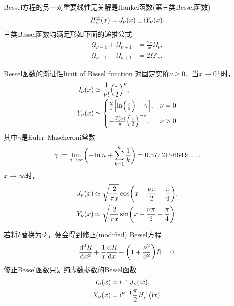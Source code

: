 Bessel方程的另一对重要线性无关解是Hankel函数(第三类Bessel函数)
\begin{equation}
    H_\nu^\pm(x) = J_\nu(x) \pm \i Y_\nu(x).
\end{equation}
三类Bessel函数均满足形如下面的递推公式
\begin{subequations}
    \label{eq:ed-cylindrical-bessel-recurrences}
    \begin{align}
        \Omega_{\nu-1} + \Omega_{\nu+1} &= \frac{2\nu}x\Omega_\nu,\\
        \Omega_{\nu-1} - \Omega_{\nu+1} &= 2\Omega'_\nu.
    \end{align}
\end{subequations}


\begin{example}{Bessel函数的渐进性}{limit of Bessel function}
    对固定实阶$\nu \ge 0$，当$x \to 0^+$时，
    \begin{subequations}
        \label{eq:ed-bessel-small-argument}
        \begin{align}
            J_\nu(x) &\simeq \frac1{\nu!}\Bigp{\frac x2}^\nu,\\
            Y_\nu(x) &\simeq
            \begin{cases}
                \frac2\pi\Bigb{\ln\Bigp{\frac x2} + \gamma},&\nu = 0\\[1ex]
                -\frac{\Gamma(\nu)}\pi\Bigp{\frac x2}^{-\nu},&\nu > 0
            \end{cases}
        \end{align}
    \end{subequations}
    其中$\gamma$是Euler--Mascheroni常数
    \[
        \gamma := \lim_{n\to\infty}\biggp{-\ln n + \sum_{k=1}^n\frac1k} = \num{0.5772156649}\ldots.
    \]
    \tcblower
    $x \to \infty$时，
    \begin{subequations}
        \label{eq:ed-bessel-large-argument}
        \begin{align}
            J_\nu(x) &\simeq \sqrt{\frac2{\pi x}}\cos\biggp{x - \frac{\nu\pi}2 - \frac\pi{4}},\\
            Y_\nu(x) &\simeq \sqrt{\frac2{\pi x}}\sin\biggp{x - \frac{\nu\pi}2 - \frac\pi{4}}.
        \end{align}
    \end{subequations}
\end{example}
若将$k$替换为$\i k$，便会得到修正(modified) Bessel方程
\begin{equation}
    \label{eq:ed-modified-bessel-equation}
    \dv[2]Rx + \frac1x\dv Rx - \biggp{1 + \frac{\nu^2}{x^2}}R = 0.
\end{equation}
修正Bessel函数只是纯虚数参数的Bessel函数
\begin{subequations}
    \label{eq:ed-modified-bessel-functions}
    \begin{align}
        I_\nu(x) &= \i^{-\nu}J_\nu(\i x),\\
        K_\nu(x) &= \i^{\nu+1}\frac\pi 2H_\nu^+(\i x).
    \end{align}
\end{subequations}

